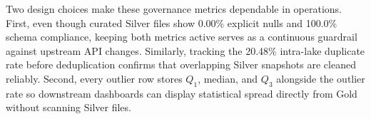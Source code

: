 Two design choices make these governance metrics dependable in operations. First, even though curated Silver files show 0.00\% explicit nulls and 100.0\% schema compliance, keeping both metrics active serves as a continuous guardrail against upstream API changes. Similarly, tracking the 20.48\% intra-lake duplicate rate before deduplication confirms that overlapping Silver snapshots are cleaned reliably. Second, every outlier row stores $Q_1$, median, and $Q_3$ alongside the outlier rate so downstream dashboards can display statistical spread directly from Gold without scanning Silver files.
